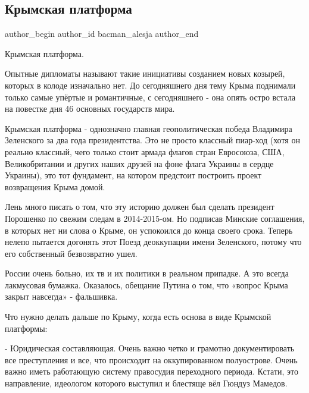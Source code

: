  
 
 
 
 
 
\subsection{Крымская платформа}
\label{sec:23_08_2021.fb.bacman_alesja.1.krym_platforma}
 
\ifcmt
 author_begin
   author_id bacman_alesja
 author_end
\fi

Крымская платформа.

Опытные дипломаты называют такие инициативы созданием новых козырей, которых в
колоде изначально нет. До сегодняшнего дня тему Крыма поднимали только самые
упёртые и романтичные, с сегодняшнего - она опять остро встала на повестке дня
46 основных государств мира. 

Крымская платформа - однозначно главная геополитическая победа Владимира
Зеленского за два года президентства. Это не просто классный пиар-ход (хотя он
реально классный, чего только стоит армада флагов стран Евросоюза, США,
Великобритании и других наших друзей на фоне флага Украины в сердце Украины),
это тот фундамент, на котором предстоит построить проект возвращения Крыма
домой. 

Лень много писать о том, что эту историю должен был сделать президент Порошенко
по свежим следам в 2014-2015-ом. Но подписав Минские соглашения, в которых нет
ни слова о Крыме, он успокоился до конца своего срока. Теперь нелепо пытается
догонять этот Поезд деоккупации имени Зеленского, потому что его собственный
безвозвратно ушел.  

России очень больно, их тв и их политики в реальном припадке. А это всегда
лакмусовая бумажка. Оказалось, обещание Путина  о том, что «вопрос Крыма закрыт
навсегда» - фальшивка.

Что нужно делать дальше по Крыму, когда есть основа в виде Крымской платформы:

- Юридическая составляющая. Очень важно четко и грамотно документировать все
преступления и все, что происходит на оккупированном полуострове. Очень важно
иметь работающую систему правосудия переходного периода. Кстати, это
направление, идеологом которого выступил и блестяще вёл Гюндуз Мамедов. 


